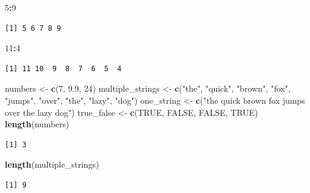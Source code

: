 \documentclass[]{book}
\newenvironment{Shaded}{\begin{snugshade}}{\end{snugshade}}
\newcommand{\KeywordTok}[1]{\textcolor[rgb]{0.13,0.29,0.53}{\textbf{#1}}}
\newcommand{\DecValTok}[1]{\textcolor[rgb]{0.00,0.00,0.81}{#1}}
\newcommand{\FloatTok}[1]{\textcolor[rgb]{0.00,0.00,0.81}{#1}}
\newcommand{\StringTok}[1]{\textcolor[rgb]{0.31,0.60,0.02}{#1}}
\newcommand{\OtherTok}[1]{\textcolor[rgb]{0.56,0.35,0.01}{#1}}
\newcommand{\OperatorTok}[1]{\textcolor[rgb]{0.81,0.36,0.00}{\textbf{#1}}}
\newcommand{\NormalTok}[1]{#1}
\theoremstyle{definition}
\theoremstyle{definition}
\theoremstyle{definition}
\theoremstyle{remark}
\begin{document}
\begin{Shaded}
\begin{Highlighting}[]
\DecValTok{5}\OperatorTok{:}\DecValTok{9}
\end{Highlighting}
\end{Shaded}

\begin{verbatim}
[1] 5 6 7 8 9
\end{verbatim}

\begin{Shaded}
\begin{Highlighting}[]
\DecValTok{11}\OperatorTok{:}\DecValTok{4}
\end{Highlighting}
\end{Shaded}

\begin{verbatim}
[1] 11 10  9  8  7  6  5  4
\end{verbatim}

\begin{Shaded}
\begin{Highlighting}[]
\NormalTok{numbers <-}\StringTok{ }\KeywordTok{c}\NormalTok{(}\DecValTok{7}\NormalTok{, }\FloatTok{9.9}\NormalTok{, }\DecValTok{24}\NormalTok{)}
\NormalTok{multiple_strings <-}\StringTok{ }\KeywordTok{c}\NormalTok{(}\StringTok{"the"}\NormalTok{, }\StringTok{"quick"}\NormalTok{, }\StringTok{"brown"}\NormalTok{, }\StringTok{"fox"}\NormalTok{, }\StringTok{"jumps"}\NormalTok{, }\StringTok{"over"}\NormalTok{, }\StringTok{"the"}\NormalTok{, }\StringTok{"lazy"}\NormalTok{, }\StringTok{"dog"}\NormalTok{)}
\NormalTok{one_string <-}\StringTok{ }\KeywordTok{c}\NormalTok{(}\StringTok{"the quick brown fox jumps over the lazy dog"}\NormalTok{)}
\NormalTok{true_false <-}\StringTok{ }\KeywordTok{c}\NormalTok{(}\OtherTok{TRUE}\NormalTok{, }\OtherTok{FALSE}\NormalTok{, }\OtherTok{FALSE}\NormalTok{, }\OtherTok{TRUE}\NormalTok{)}
\KeywordTok{length}\NormalTok{(numbers)}
\end{Highlighting}
\end{Shaded}

\begin{verbatim}
[1] 3
\end{verbatim}

\begin{Shaded}
\begin{Highlighting}[]
\KeywordTok{length}\NormalTok{(multiple_strings)}
\end{Highlighting}
\end{Shaded}

\begin{verbatim}
[1] 9
\end{verbatim}
\end{document}
